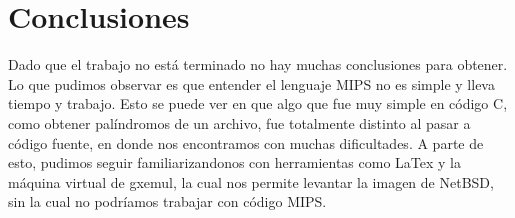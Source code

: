 \documentclass[10pt,a4paper]{article}
\begin{document}



\section{Conclusiones}

Dado que el trabajo no está terminado no hay muchas conclusiones para obtener. Lo que pudimos observar es que entender el lenguaje MIPS no es simple y lleva tiempo y trabajo. Esto se puede ver en que algo que fue muy simple en código C, como obtener palíndromos de un archivo, fue totalmente distinto al pasar a código fuente, en donde nos encontramos con muchas dificultades. A parte de esto, pudimos seguir familiarizandonos con herramientas como LaTex y la máquina virtual de gxemul, la cual nos permite levantar la imagen de NetBSD, sin la cual no podríamos trabajar con código MIPS.
\end{document}
